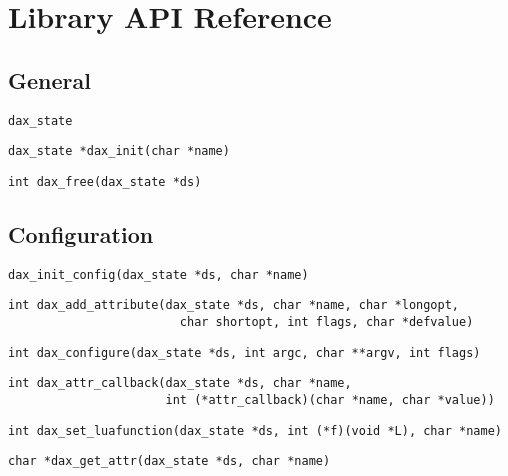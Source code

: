 \chapter{Library API Reference}
\section{General}
\begin{verbatim}
dax_state
\end{verbatim}

\begin{verbatim}
dax_state *dax_init(char *name)
\end{verbatim}

\begin{verbatim}
int dax_free(dax_state *ds)
\end{verbatim}

\section{Configuration}

\begin{verbatim}
dax_init_config(dax_state *ds, char *name)
\end{verbatim}

\begin{verbatim}
int dax_add_attribute(dax_state *ds, char *name, char *longopt,
                        char shortopt, int flags, char *defvalue)
\end{verbatim}

\begin{verbatim}
int dax_configure(dax_state *ds, int argc, char **argv, int flags)
\end{verbatim}

\begin{verbatim}
int dax_attr_callback(dax_state *ds, char *name,
                      int (*attr_callback)(char *name, char *value))
\end{verbatim}

\begin{verbatim}
int dax_set_luafunction(dax_state *ds, int (*f)(void *L), char *name)
\end{verbatim}

\begin{verbatim}
char *dax_get_attr(dax_state *ds, char *name)
\end{verbatim}


